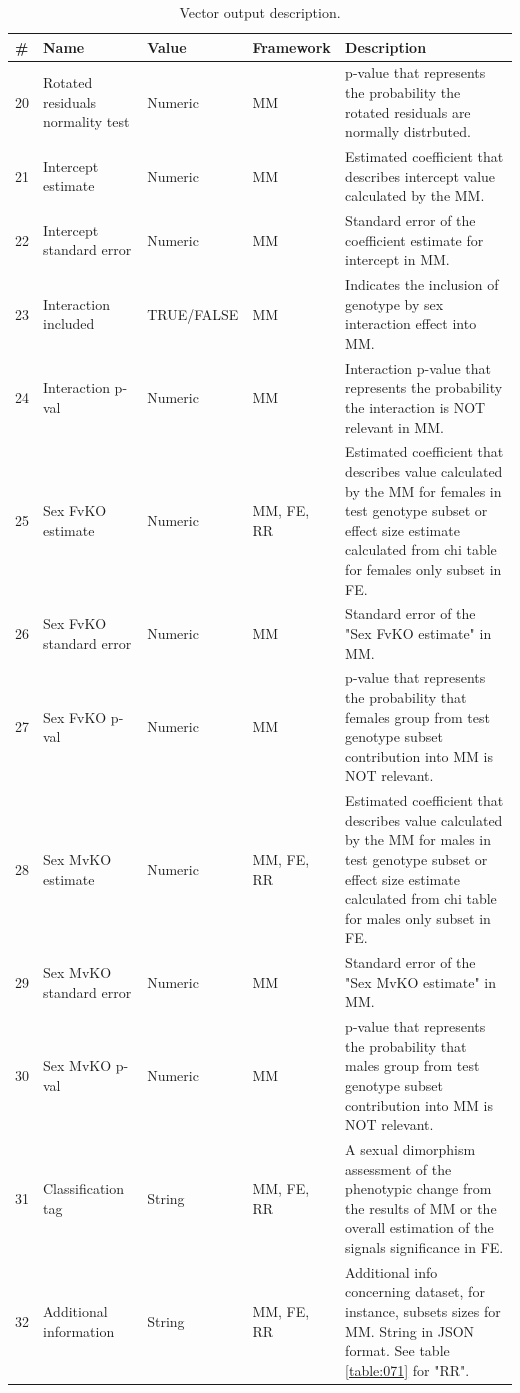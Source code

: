 \documentclass[12pt,a4paper]{article}
\begin{document}
\begin{table}
 
\begin{tabular}{| l | l | l | l | p{10cm} |}
  \hline
\#&Name&Value&Framework&Description\\\hline
20&Rotated residuals normality test&Numeric&MM&p-value that represents the probability the rotated residuals are normally distrbuted.\\
21&Intercept estimate&Numeric&MM&Estimated coefficient that describes intercept value calculated by the MM.\\
22&Intercept standard error&Numeric&MM&Standard error of the coefficient estimate for intercept in MM.\\
23&Interaction included&TRUE/FALSE&MM&Indicates the inclusion of genotype by sex interaction effect into MM.\\
24&Interaction p-val&Numeric&MM&Interaction p-value that represents the probability the interaction is NOT relevant in MM.\\
25&Sex FvKO estimate&Numeric&MM, FE, RR&Estimated coefficient that describes value calculated by the MM for females in test genotype subset or effect size estimate calculated from chi table for females only subset in FE.\\
26&Sex FvKO standard error&Numeric&MM&Standard error of the "Sex FvKO estimate" in MM.\\
27&Sex FvKO p-val&Numeric&MM&p-value that represents the probability that females group from test genotype subset contribution into MM is NOT relevant.\\
28&Sex MvKO estimate&Numeric&MM, FE, RR&Estimated coefficient that describes value calculated by the MM for males in test genotype subset or effect size estimate calculated from chi table for males only subset in FE.\\
29&Sex MvKO standard error&Numeric&MM&Standard error of the "Sex MvKO estimate" in MM.\\
30&Sex MvKO p-val&Numeric&MM&p-value that represents the probability that males group from test genotype subset contribution into MM is NOT relevant.\\
31&Classification tag&String&MM, FE, RR&A sexual dimorphism assessment of the phenotypic change from the results of MM or the overall estimation of the signals significance in FE.\\
32&Additional information&String&MM, FE, RR&Additional info concerning dataset, for instance, subsets sizes for MM. String in JSON format. See table \ref{table:071} for "RR".\\
\hline  
\end{tabular}
\caption{Vector output description.}\label{table:07}
\end{table}
\end{document}
